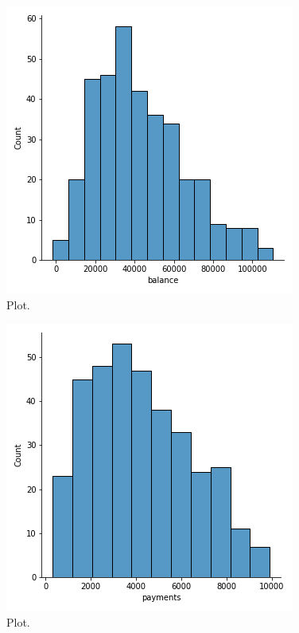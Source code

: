 \documentclass[a4paper,12pt]{report}
\begin{document}
		\begin{figure}[H]
		\begin{center}
		\includegraphics[scale=0.40]{balance_barChart}	
		\end{center}
		\caption{Plot.}
		\label{fig:balance_barChart}
		\end{figure}

		\begin{figure}[H]
		\begin{center}
		\includegraphics[scale=0.40]{payments_barChart}	
		\end{center}
		\caption{Plot.}
		\label{fig:payments_barChart}
		\end{figure}
\end{document}

